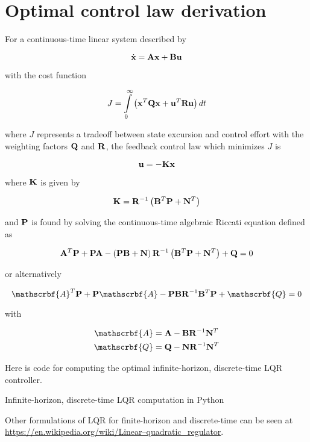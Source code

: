\section{Optimal control law derivation}
\label{sec:app-optimal-control-law-deriv}

For a continuous-time linear system described by

\begin{equation}
  \dot{\mathbf{x}} = \mathbf{A}\mathbf{x} + \mathbf{B}\mathbf{u}
\end{equation}

with the cost function

\begin{equation*}
  J = \int\limits_0^\infty \left(\mathbf{x}^T\mathbf{Q}\mathbf{x} +
    \mathbf{u}^T\mathbf{R}\mathbf{u}\right) dt
\end{equation*}

where $J$ represents a tradeoff between \gls{state} excursion and control
effort with the weighting factors $\mathbf{Q}$ and $\mathbf{R}$, the feedback
\gls{control law} which minimizes $J$ is

\begin{equation*}
  \mathbf{u} = -\mathbf{K}\mathbf{x}
\end{equation*}

where $\mathbf{K}$ is given by

\begin{equation*}
  \mathbf{K} = \mathbf{R}^{-1} \left(\mathbf{B}^T\mathbf{P} + \mathbf{N}^T\right)
\end{equation*}

and $\mathbf{P}$ is found by solving the continuous-time algebraic Riccati equation
defined as

\begin{equation*}
  \mathbf{A}^T\mathbf{P} + \mathbf{P}\mathbf{A} - \left(\mathbf{P}\mathbf{B} +
    \mathbf{N}\right) \mathbf{R}^{-1} \left(\mathbf{B}^T\mathbf{P} + \mathbf{N}^T\right) +
    \mathbf{Q} = 0
\end{equation*}

or alternatively

\begin{equation*}
  \mathscrbf{A}^T\mtx{P} + \mtx{P}\mathscrbf{A} -
    \mtx{P}\mtx{B}\mtx{R}^{-1}\mtx{B}^T\mtx{P} + \mathscrbf{Q} = 0
\end{equation*}

with

\begin{align*}
  \mathscrbf{A} &= \mtx{A} - \mtx{B}\mtx{R}^{-1}\mtx{N}^T \\
  \mathscrbf{Q} &= \mtx{Q} - \mtx{N}\mtx{R}^{-1}\mtx{N}^T
\end{align*}

Here is code for computing the optimal infinite-horizon, discrete-time LQR
controller.

\begin{snippet}
  \caption{Infinite-horizon, discrete-time LQR computation in Python}
  \label{snip:dlqr}
\end{snippet}

Other formulations of LQR for finite-horizon and discrete-time can be seen at
\url{https://en.wikipedia.org/wiki/Linear–quadratic_regulator}.
